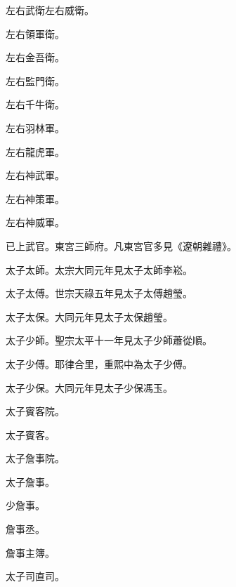 \begin{pinyinscope}
 左右武衛左右威衛。



 左右領軍衛。



 左右金吾衛。



 左右監門衛。



 左右千牛衛。



 左右羽林軍。



 左右龍虎軍。



 左右神武軍。



 左右神策軍。



 左右神威軍。



 已上武官。東宮三師府。凡東宮官多見《遼朝雜禮》。



 太子太師。太宗大同元年見太子太師李崧。



 太子太傅。世宗天祿五年見太子太傅趙瑩。



 太子太保。大同元年見太子太保趙瑩。



 太子少師。聖宗太平十一年見太子少師蕭從順。



 太子少傅。耶律合里，重熙中為太子少傅。



 太子少保。大同元年見太子少保馮玉。



 太子賓客院。



 太子賓客。



 太子詹事院。



 太子詹事。



 少詹事。



 詹事丞。



 詹事主簿。



 太子司直司。




\end{pinyinscope}
